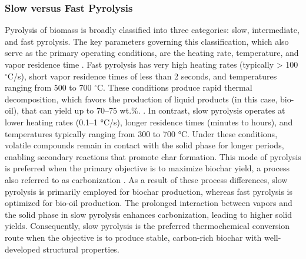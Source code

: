 \subsubsection{Slow versus Fast Pyrolysis}
Pyrolysis of biomass is broadly classified into three categories: slow, intermediate, and fast pyrolysis. The key parameters governing this classification, which also serve as the primary operating conditions, are the heating rate, temperature, and vapor residence time \cite{Vuppaladadiyam2022}.
\vspace{0.3em}
\newline
Fast pyrolysis has very high heating rates (typically > 100 $^{\circ}$C/s), short vapor residence times of less than 2 seconds, and temperatures ranging from 500 to 700 $^{\circ}$C. These conditions produce rapid thermal decomposition, which favors the production of liquid products (in this case, bio-oil), that can yield up to 70--75 wt.\%. \cite{Lehmann2015,Luque2016}.
\vspace{0.3em}
\newline
In contrast, slow pyrolysis operates at lower heating rates (0.1–1 °C/s), longer residence times (minutes to hours), and temperatures typically ranging from 300 to 700 °C. Under these conditions, volatile compounds remain in contact with the solid phase for longer periods, enabling secondary reactions that promote char formation. This mode of pyrolysis is preferred when the primary objective is to maximize biochar yield, a process also referred to as carbonization \cite{Lehmann2015,Pahnila2023}.
As a result of these process differences, slow pyrolysis is primarily employed for biochar production, whereas fast pyrolysis is optimized for bio-oil production. The prolonged interaction between vapors and the solid phase in slow pyrolysis enhances carbonization, leading to higher solid yields. Consequently, slow pyrolysis is the preferred thermochemical conversion route when the objective is to produce stable, carbon-rich biochar with well-developed structural properties.

